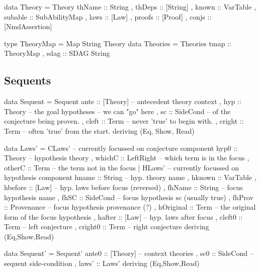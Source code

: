 \begin{code}
data Theory
  = Theory {
      thName   :: String
    , thDeps   :: [String]
    , known    :: VarTable
    , subable  :: SubAbilityMap
    , laws     :: [Law]
    , proofs   :: [Proof]
    , conjs    :: [NmdAssertion]
    }
\end{code}

\begin{code}
type TheoryMap = Map String Theory
data Theories
  = Theories { tmap :: TheoryMap
             , sdag :: SDAG String }
\end{code}

\subsection{Sequents}

\begin{code}
data Sequent
  = Sequent {
     ante :: [Theory] -- antecedent theory context
   , hyp :: Theory -- the goal hypotheses -- we can "go" here
   , sc :: SideCond -- of the conjecture being proven.
   , cleft :: Term -- never 'true' to begin with.
   , cright :: Term -- often 'true' from the start.
   }
  deriving (Eq, Show, Read)
\end{code}

\begin{code}
data Laws'
  = CLaws' { -- currently focussed on conjecture component
      hyp0  :: Theory -- hypothesis theory
    , whichC :: LeftRight -- which term is in the focus
    , otherC :: Term  -- the term not in the focus
    }
  | HLaws' { -- currently focussed on hypothesis component
      hname     :: String -- hyp. theory name
    , hknown    :: VarTable
    , hbefore   :: [Law] -- hyp. laws before focus (reversed)
    , fhName    :: String -- focus hypothesis name
    , fhSC      :: SideCond -- focus hypothesis sc (usually true)
    , fhProv    :: Provenance -- focus hypothesis provenance (?)
    , hOriginal :: Term -- the original form of the focus hypothesis
    , hafter    :: [Law] -- hyp. laws after focus
    , cleft0    :: Term -- left conjecture
    , cright0   :: Term -- right conjecture
    }
  deriving (Eq,Show,Read)
\end{code}

\begin{code}
data Sequent'
  = Sequent' {
      ante0 :: [Theory] -- context theories
    , sc0       :: SideCond -- sequent side-condition
    , laws'     :: Laws'
    }
  deriving (Eq,Show,Read)
\end{code}


